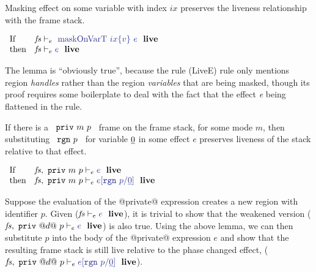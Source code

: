 %
\begin{lemma} Masking effect on some variable with index $ix$ preserves the liveness relationship with the frame stack.
\end{lemma}
$
\begin{array}{ll}
    \pIf   & \LiveE{\mfs}{~\trm{maskOnVarT}~ ix\bra{v}~ e}
\\  \pthen & \LiveE{\mfs}{e}
\end{array}
$

\medskip\noindent
The lemma is ``obviously true'', because the rule (LiveE) rule only mentions region \emph{handles} rather than the region \emph{variables} that are being masked, though its proof requires some boilerplate to deal with the fact that the effect \emph{e} being flattened in the rule.
\qqed


%
\begin{lemma} If there is a ~$\texttt{priv}~ m~ p$~ frame on the frame stack, for some mode $m$, then substituting ~$\texttt{rgn}~ p$~ for variable $\underline{0}$ in some effect $e$ preserves liveness of the stack relative to that effect.
\end{lemma}
$
\begin{array}{ll}
    \pIf   & \LiveE     {\mfs,~ \fpriv{m}{p}}
                        {e}
\\  \pthen & \LiveE     {\mfs,~ \fpriv{m}{p}}
                        {e[\trgn{p}/\un{0}]}
\end{array}
$

\medskip\noindent
Suppose the evaluation of the @private@ expression creates a new region with identifier $p$. Given ($\LiveE{\mfs}{e}$), it is trivial to show that the weakened version ($\LiveE{\mfs,~ \fpriv{@d@}{p}}{e}$) is also true. Using the above lemma, we can then substitute $p$ into the body of the @private@ expression $e$ and show that the resulting frame stack is still live relative to the phase changed effect, ($\LiveE{\mfs,~ \fpriv{@d@}{p}}{e[\trgn{p}/\un{0}]}$). 
\smallskip
\qqed



